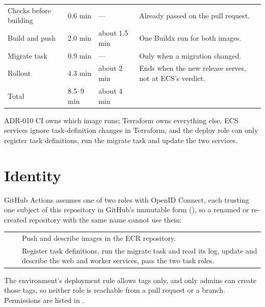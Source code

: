 \begin{xltabular}{\linewidth}{@{}P{38mm} P{22mm} P{22mm} L@{}}
  \toprule
   &  &  & \\
  \midrule
  Checks before building & 0.6 min & --- & Already passed on the pull request.\\
  Build and push & 2.0 min & about 1.5 min & One Buildx run for both images.\\
  Migrate task & 0.9 min & --- & Only when a migration changed.\\
  Rollout & 4.3 min & about 2 min & Ends when the new release serves, not at ECS's verdict.\\
  \midrule
  Total & 8.5--9 min & about 4 min & \\
  \bottomrule
\end{xltabular}

\begin{decision}{ADR-010}
  CI owns which image runs; Terraform owns everything else. ECS services ignore task-definition
  changes in Terraform, and the deploy role can only register task definitions, run the migrate
  task and update the two services.
\end{decision}

\section{Identity}
GitHub Actions assumes one of two roles with OpenID Connect, each trusting one subject of this
repository in GitHub's immutable form (), so a
renamed or re-created repository with the same name cannot use them:

\begin{xltabular}{\linewidth}{@{}P{34mm} P{48mm} L@{}}
  \toprule
   &  & \\
  \midrule
   &  & Push and describe images in the  ECR repository.\\
   &  & Register task definitions, run the migrate task and read its log, update and describe the web and worker services, pass the two task roles.\\
  \bottomrule
\end{xltabular}

The  environment's deployment rule allows  tags only, and only admins
can create those tags, so neither role is reachable from a pull request or a branch. Permissions
are listed in .

